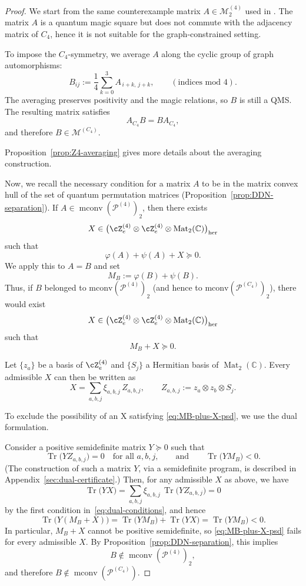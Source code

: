 \documentclass[11pt, a4paper]{article}
\theoremstyle{plain}
\theoremstyle{definition}
\theoremstyle{remark}
\newcommand{\C}{\mathbb{C}}
\newcommand{\cM}{\mathcal{M}} \newcommand{\cN}{\mathcal{N}} \newcommand{\cO}{\mathcal{O}}
\newcommand{\cP}{\mathcal{P}} \newcommand{\cQ}{\mathcal{Q}} \newcommand{\cR}{\mathcal{R}}
\DeclareMathOperator{\Tr}{Tr}
\newcommand{\Mat}[2]{\operatorname{Mat}_{#2}\!\left(#1\right)}
\begin{document}
\begin{proof}
We start from the same counterexample matrix
\(A \in \cM_2^{(4)}\) used in \cite{DDN20}.
The matrix \(A\) is a quantum magic square but does not commute with
the adjacency matrix of \(C_4\), hence it is not suitable for the
graph-constrained setting.

To impose the \(C_4\)-symmetry, we average \(A\) along the cyclic
group of graph automorphisms:
\[
  B_{ij}
  := \frac{1}{4} \sum_{k=0}^3 A_{\,i+k,\, j+k},
  \qquad (\text{indices mod } 4).
\]
The averaging preserves positivity and the magic relations, so
\(B\) is still a QMS.
The resulting
matrix satisfies
\[
A_{C_4} B = B A_{C_4},
\]
and therefore \(B \in \cM^{(C_4)}\).

Proposition~\ref{prop:Z4-averaging} gives more details about the averaging construction.

Now, we recall the necessary condition for a matrix \(A\) to be in the matrix convex hull of the set of quantum permutation matrices
(Proposition~\ref{prop:DDN-separation}).
If \(A \in \operatorname{mconv}(\mathcal{P}^{(4)})_2\), then there exists
\[
X \in \bigl(\cZ_e^{(4)} \otimes \cZ_e^{(4)}
           \otimes \Mat{\C}{2}\bigr)_{\mathrm{her}}
\]
such that
\[
\varphi(A) + \psi(A) + X \succeq 0.
\]
We apply this to \(A=B\) and set
\[
M_B := \varphi(B) + \psi(B).
\]
Thus, if \(B\) belonged to \(\mathrm{mconv}(\cP^{(4)})_2\) (and hence to
\(\mathrm{mconv}(\cP^{(C_4)})_2\)), there would exist
\[
X \in \bigl(\cZ_e^{(4)} \otimes \cZ_e^{(4)}
           \otimes \Mat{\C}{2}\bigr)_{\mathrm{her}}
\]
such that
\begin{equation}\label{eq:MB-plus-X-psd}
M_B + X \succeq 0.
\end{equation}

Let \(\{z_a\}\) be a basis of \(\cZ_e^{(4)}\) and
\(\{S_j\}\) a Hermitian basis of \(\Mat{\C}{2}\).
Every admissible \(X\) can then be written as
\[
X = \sum_{a,b,j} \xi_{a,b,j}\,
     Z_{a,b,j},
\qquad
Z_{a,b,j} := z_a \otimes z_b \otimes S_j.
\]

To exclude the possibility of an X satisfying \eqref{eq:MB-plus-X-psd}, we use the dual formulation.


Consider a positive semidefinite matrix \(Y \succeq 0\) such that
\begin{equation}\label{eq:dual-conditions}
\Tr\!\bigl(Y Z_{a,b,j}\bigr)=0
\quad\text{for all }a,b,j,
\qquad\text{and}\qquad
\Tr\!\bigl(Y M_B\bigr) < 0.
\end{equation}
(The construction of such a matrix \(Y\), via a semidefinite program,
is described in Appendix~\ref{sec:dual-certificate}.)  
Then, for any admissible \(X\) as above, we have
\[
\Tr\!\bigl(YX\bigr)
 = \sum_{a,b,j} \xi_{a,b,j}\,
   \Tr\!\bigl(Y Z_{a,b,j}\bigr)
 = 0
\]
by the first condition in~\eqref{eq:dual-conditions}, and hence
\[
\Tr\!\bigl(Y(M_B+X)\bigr)
 = \Tr\!\bigl(Y M_B\bigr) + \Tr\!\bigl(YX\bigr)
 = \Tr\!\bigl(Y M_B\bigr)
 < 0.
\]
In particular, \(M_B+X\) cannot be positive semidefinite, so
\eqref{eq:MB-plus-X-psd} fails for every admissible \(X\).
By Proposition~\ref{prop:DDN-separation}, this implies
\[
B \notin \operatorname{mconv}(\mathcal{P}^{(4)})_2,
\]
and therefore
\(B \notin \operatorname{mconv}(\cP^{(C_4)})\).
\end{proof}
\end{document}
